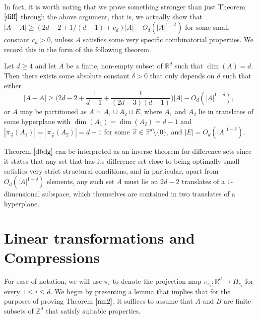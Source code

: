 In fact, it is worth noting that we prove something stronger than just Theorem $\ref{diff}$ through the above argument, that is, we actually show that $|A-A| \geq (2d - 2 + 1/(d-1) + c_d) |A| - O_d(|A|^{1 - \delta})$ for some small constant $c_d >0$, unless $A$ satisfies some very specific combinatorial properties. We record this in the form of the following theorem. 

\begin{theorem} \label{dbdg}
Let $d \geq 4$ and let $A$ be a finite, non-empty subset of $\mathbb{R}^d$ such that $\dim(A) = d$. Then there exists some absolute constant $\delta >0$ that only depends on $d$ such that either 
\[ |A-A| \geq \bigg(2d - 2  + \frac{1}{d-1} + \frac{1}{(2d-3)(d-1)} \bigg) |A| - O_d(|A|^{1 - \delta}), \]
 or $A$ may be partitioned as $A= A_1 \cup A_2 \cup E$, where $A_1$ and $A_2$ lie in translates of some hyperplane with $\dim(A_1) = \dim(A_2) = d-1$ and $|\pi_{\vec{v}}(A_1)| = |\pi_{\vec{v}}(A_2)| = d-1$ for some $\vec{v} \in \mathbb{R}^d \setminus \{0\}$, and $|E| = O_{d}(|A|^{1- \delta})$.
\end{theorem}

Theorem $\ref{dbdg}$ can be interpreted as an inverse theorem for difference sets since it states that any set that has its difference set close to being optimally small satisfies very strict structural conditions, and in particular, apart from $O_{d}(|A|^{1- \delta})$ elements, any such set $A$ must lie on $2d-2$ translates of a $1$-dimensional subspace, which themselves are contained in two translates of a hyperplane.





\section{Linear transformations and Compressions}

For ease of notation, we will use $\pi_{i}$ to denote the projection map $\pi_{e_{i}}: \mathbb{R}^d \to H_{e_{i}}$ for every $1 \leq i \leq d$. We begin by presenting a lemma that implies that for the purposes of proving Theorem $\ref{mn2}$, it suffices to assume that $A$ and $B$ are finite subsets of $\mathbb{Z}^d$ that satisfy suitable properties.


